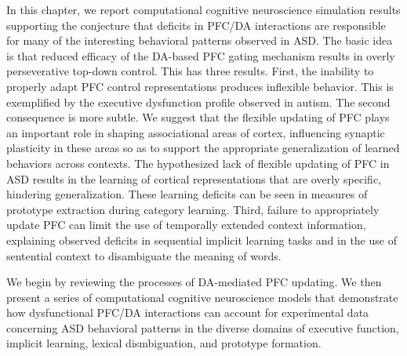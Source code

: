 In this chapter, we report computational cognitive neuroscience simulation results supporting the conjecture that deficits in PFC/DA interactions are responsible for many of the interesting behavioral patterns observed in ASD. The basic idea is that reduced efficacy of the DA-based PFC gating mechanism results in overly perseverative top-down control. This has three results. First, the inability to properly adapt PFC control representations produces inflexible behavior. This is exemplified by the executive dysfunction profile observed in autism. The second consequence is more subtle. We suggest that the flexible updating of PFC plays an important role in shaping associational areas of cortex, influencing synaptic plasticity in these areas so as to support the appropriate generalization of learned behaviors across contexts. The hypothesized lack of flexible updating of PFC in ASD results in the learning of cortical representations that are overly specific, hindering generalization. These learning deficits can be seen in measures of prototype extraction during category learning. Third, failure to appropriately update PFC can limit the use of temporally extended context information, explaining observed deficits in sequential implicit learning tasks and in the use of sentential context to disambiguate the meaning of words.



We begin by reviewing the processes of DA-mediated PFC updating. We then present a series of computational cognitive neuroscience models that demonstrate how dysfunctional PFC/DA interactions can account for experimental data concerning ASD behavioral patterns in the diverse domains of executive function, implicit learning, lexical dismbiguation, and prototype formation.

